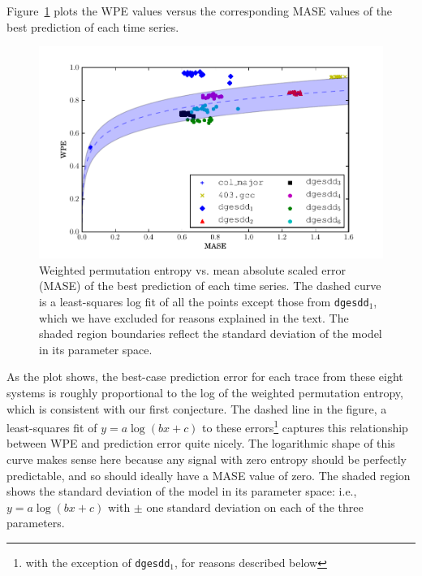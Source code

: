 Figure~\ref{fig:wpe_vs_mase_best} plots the WPE values versus the
corresponding MASE values of the best prediction of each time series.
\begin{figure}[htbp]
  \centering
  \includegraphics[width=\columnwidth]{figs/new_prediction_vs_entropy}
  \caption{Weighted permutation entropy vs. mean absolute scaled error
    (MASE) of the best prediction of each time series.
%
%
The dashed curve is a least-squares log fit of all the points except
those from {\tt dgesdd$_1$}, which we have excluded for reasons
explained in the text.  The shaded region boundaries reflect the
standard deviation of the model in its parameter space.}
  \label{fig:wpe_vs_mase_best}
\end{figure}
As the plot shows, the best-case prediction error for each trace from
these eight systems is roughly proportional to the log of the weighted
permutation entropy, which is consistent with our first conjecture.
The dashed line in the figure, a least-squares fit of $y = a \log(b x
+ c)$ to these errors\footnote{with the exception of {\tt dgesdd$_1$},
  for reasons described below} captures this relationship between WPE
and prediction error quite nicely.  The logarithmic shape of this
curve makes sense here because any signal with zero entropy should be
perfectly predictable, and so should ideally have a MASE value of
zero.  The shaded region shows the standard deviation of the model in
its parameter space: i.e., $y = a \log(b x + c)$ with $\pm$ one
standard deviation on each of the three parameters.

